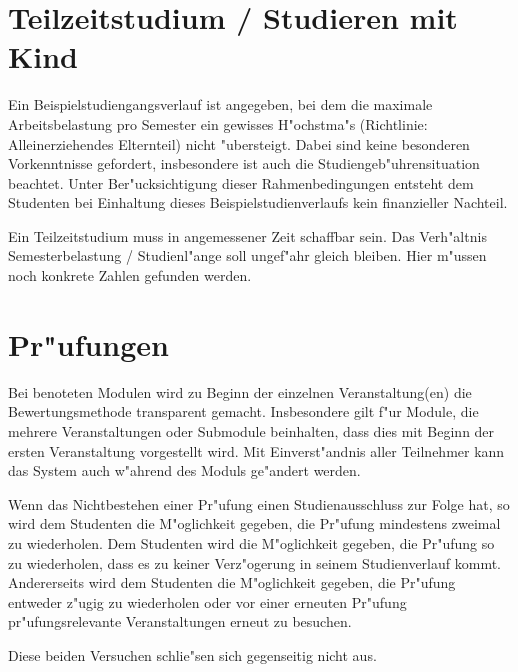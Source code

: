 \section{Teilzeitstudium / Studieren mit Kind}

Ein Beispielstudiengangsverlauf ist angegeben, bei dem die maximale Arbeitsbelastung 
pro Semester ein gewisses H"ochstma"s (Richtlinie: Alleinerziehendes Elternteil) nicht 
"ubersteigt. Dabei sind keine besonderen Vorkenntnisse gefordert, insbesondere ist auch
die Studiengeb"uhrensituation beachtet. Unter Ber"ucksichtigung dieser Rahmenbedingungen
entsteht dem Studenten bei Einhaltung dieses Beispielstudienverlaufs kein finanzieller
Nachteil.

\begin{kcmt}\begin{komacmt}
Ein Teilzeitstudium muss in angemessener Zeit schaffbar sein. Das Verh"altnis 
Semesterbelastung / Studienl"ange soll ungef"ahr gleich bleiben. 
Hier m"ussen noch konkrete Zahlen gefunden werden. 
\end{komacmt}\end{kcmt}

\section{Pr"ufungen}

Bei benoteten Modulen wird zu Beginn der einzelnen Veranstaltung(en) die Bewertungsmethode 
transparent gemacht. Insbesondere gilt f"ur Module, die mehrere Veranstaltungen 
oder Submodule beinhalten, dass dies mit Beginn der ersten Veranstaltung vorgestellt wird.
Mit Einverst"andnis aller Teilnehmer kann das System auch w"ahrend des Moduls ge"andert werden. 

Wenn das Nichtbestehen einer Pr"ufung einen Studienausschluss zur Folge hat, so 
wird dem Studenten die M"oglichkeit gegeben, die Pr"ufung mindestens zweimal
zu wiederholen. Dem Studenten wird die M"oglichkeit gegeben, die Pr"ufung 
so zu wiederholen, dass es zu keiner Verz"ogerung in seinem Studienverlauf kommt. 
Andererseits wird dem Studenten die M"oglichkeit gegeben, die Pr"ufung entweder
z"ugig zu wiederholen oder vor einer erneuten Pr"ufung pr"ufungsrelevante Veranstaltungen
erneut zu besuchen.

\begin{kcmt}\begin{komacmt}
Diese beiden Versuchen schlie"sen sich gegenseitig nicht aus.
\end{komacmt}\end{kcmt}

